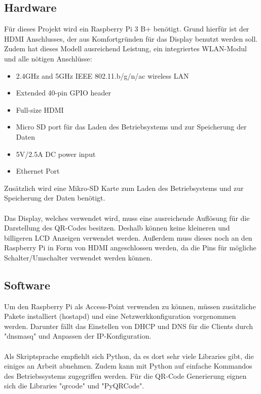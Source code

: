 \documentclass[a4paper,11pt,singlespacing]{article}
\begin{document}
		\subsection{Hardware}
		Für dieses Projekt wird ein Raspberry Pi 3 B+ benötigt. Grund hierfür ist der HDMI Anschlusses, der aus Komfortgründen für das Display benutzt werden soll. Zudem hat dieses Modell ausreichend Leistung, ein integriertes WLAN-Modul und alle nötigen Anschlüsse:
		\begin{itemize}
			\item 2.4GHz and 5GHz IEEE 802.11.b/g/n/ac wireless LAN
			\item Extended 40-pin GPIO header
			\item Full-size HDMI
			\item Micro SD port für das Laden des Betriebsystems und zur Speicherung der Daten
			\item 5V/2.5A DC power input
			\item Ethernet Port
		\end{itemize}
		Zusätzlich wird eine Mikro-SD Karte zum Laden des Betriebsystems und zur Speicherung der Daten benötigt. \\ \\
		Das Display, welches verwendet wird, muss eine ausreichende Auflösung für die Darstellung des QR-Codes besitzen. Deshalb können keine kleineren und billigeren LCD Anzeigen verwendet werden. Außerdem muss dieses noch an den Raspberry Pi in Form von HDMI angeschlossen werden, da die Pins für mögliche Schalter/Umschalter verwendet werden können.
		
		\subsection{Software}
		Um den Raspberry Pi als Access-Point verwenden zu können, müssen zusätzliche Pakete installiert (hostapd) und eine Netzwerkkonfiguration vorgenommen werden. Darunter fällt das Einstellen von DHCP und DNS für die Clients durch "dnsmasq" und Anpassen der IP-Konfiguration. \\ \\
		
		Als Skriptsprache empfiehlt sich Python, da es dort sehr viele Libraries gibt, die einiges an Arbeit abnehmen. Zudem kann mit Python auf einfache Kommandos des Betriebssystems zugegriffen werden. Für die QR-Code Generierung eignen sich die Libraries "qrcode" und "PyQRCode". 
		
\end{document}
